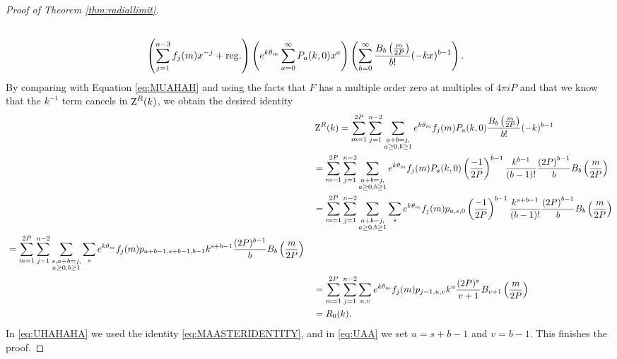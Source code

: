 \begin{proof}[Proof of Theorem \ref{thm:radiallimit}]
\begin{align}
	\\ &\left(\sum_{j=1}^{n-3} f_j(m)x^{-j}+\rm{reg.}\right)\left(e^{k\theta_m}\sum^{\infty}_{a=0} P_a(k,0)x^a\right)\left(\sum_{b=0}^{\infty} \frac{B_b\left(\frac{m}{2P}\right)}{b!} (-kx)^{b-1} \right).
\end{align}
By comparing with Equation \eqref{eq:MUAHAH} and using the facts that $F$ has a multiple order zero at multiples of $4\pi iP$ and that we know that the $k^{-1}$ term cancels in $\operatorname{Z}^R(k)$, we obtain the desired identity
\begin{align}
&\operatorname{Z}^R(k)= \sum_{m=1}^{2P} \sum_{j=1}^{n-2} \sum_{\substack{a+b=j, \\ a\geq 0, b \geq 1}} e^{k\theta_m} f_j(m)P_a(k,0)\frac{B_b\left(\frac{m}{2P}\right)}{b!} (-k)^{b-1}
\\ &=  \sum_{m=1}^{2P} \sum_{j=1}^{n-2}  \sum_{\substack{a+b=j, \\ a\geq 0, b \geq 1}} e^{k\theta_m} f_j(m)P_a(k,0)\left(\frac{-1}{2P}\right)^{b-1} \frac{k^{b-1}}{(b-1)!}  \frac{\left(2P\right)^{b-1}}{b}B_b\left(\frac{m}{2P}\right)
\\ &= \sum_{m=1}^{2P} \sum_{j=1}^{n-2}  \sum_{\substack{a+b=j, \\ a\geq 0, b \geq 1}} \sum_{s} e^{k\theta_m} f_j(m)p_{a,s,0}\left(\frac{-1}{2P}\right)^{b-1} \frac{k^{s+b-1}}{(b-1)!}  \frac{\left(2P\right)^{b-1}}{b}B_b\left(\frac{m}{2P}\right)
\\ \begin{split}  \label{eq:UHAHAHA} &=\sum_{m=1}^{2P} \sum_{j=1}^{n-2}  \sum_{\substack{s,a+b=j, \\ a\geq 0, b \geq 1}} \sum_{s} e^{k\theta_m} f_j(m) p_{a+b-1,s+b-1,b-1}  k^{s+b-1}   \frac{(2P)^{b-1}}{b} B_b\left(\frac{m}{2P}\right) \end{split}
\\ &= \label{eq:UAA} \sum_{m=1}^{2P} \sum_{j=1}^{n-2}  \sum_{u,v}  e^{k\theta_m} f_j(m) p_{j-1,u,v} k^u \frac{(2P)^{v}}{v+1} B_{v+1}\left(\frac{m}{2P}\right)
\\&=R_0(k). 
\end{align}
In \eqref{eq:UHAHAHA} we used the identity \eqref{eq:MAASTERIDENTITY}, and in \eqref{eq:UAA} we set $u=s+b-1$ and $v=b-1$. This finishes the proof. \end{proof}




  